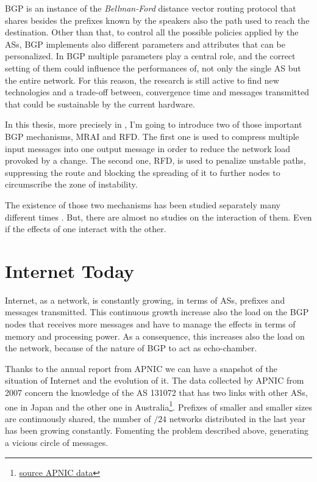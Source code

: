 \ac{BGP} is an instance of the \textit{Bellman-Ford} distance vector routing
protocol that shares besides the prefixes known by the speakers also the
path used to reach the destination.
Other than that, to control all the possible policies applied by the \acp{AS},
\ac{BGP} implements also different parameters and attributes that can be
personalized.
In \ac{BGP} multiple parameters play a central role, and the correct setting
of them could influence the performances of, not only the single \ac{AS} but
the entire network.
For this reason, the research is still active to find new technologies and
a trade-off between, convergence time and messages transmitted that could
be sustainable by the current hardware.

In this thesis, more precisely in , I'm going to introduce
two of those important \ac{BGP} mechanisms, \ac{MRAI} and \ac{RFD}.
The first one is used to compress multiple input messages into one
output message in order to reduce the network load provoked by a change.
The second one, \ac{RFD}, is used to penalize unstable paths, suppressing
the route and blocking the spreading of it to further nodes to circumscribe
the zone of instability.

The existence of those two mechanisms has been studied separately many different
times \cite{fabrikant2011there,daggitt2018rate,qiu2005optimal,gray2020bgp}.
But, there are almost no studies on the interaction of them.
Even if the effects of one interact with the other.

\section{Internet Today}
\label{sec:internet_today}

Internet, as a network, is constantly growing, in terms of \acp{AS}, prefixes
and messages transmitted.
This continuous growth increase also the load on the \ac{BGP} nodes that
receives more messages and have to manage the effects in terms of memory
and processing power.
As a consequence, this increases also the load on the network, because of the
nature of \ac{BGP} to act as echo-chamber.

Thanks to the annual report from \ac{APNIC} we can have a snapshot of
the situation of Internet and the evolution of it.
The data collected by \ac{APNIC} from \num{2007} concern the knowledge
of the \ac{AS} 131072 that has two links with other \acp{AS}, one in Japan and
the other one in Australia\footnote{\href{https://blog.apnic.net/2021/01/05/bgp-in-2020-the-bgp-table/}{source APNIC data}}.
Prefixes of smaller and smaller sizes are continuously shared, the number of
$/24$ networks distributed in the last year has been growing constantly.
Fomenting the problem described above, generating a vicious circle of messages.

